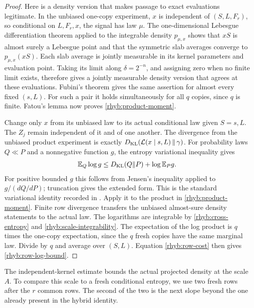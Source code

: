 \begin{proof}
Here is a density version that makes passage to exact evaluations
legitimate.  In the unbiased one-copy experiment, \(x\) is independent
of \((S,L,F_r)\), so conditional on \(L,F_r,x\), the signal has law
\(\mu\).  The one-dimensional Lebesgue differentiation theorem applied
to the integrable density \(p_{\mu,x}\) shows that \(xS\) is almost surely
a Lebesgue point and that the symmetric slab averages converge to
\(p_{\mu,x}(xS)\).  Each slab average is jointly measurable in its
kernel parameters and evaluation point.  Taking its limit along
\(\delta=2^{-n}\), and assigning zero when no finite limit exists,
therefore gives a jointly measurable density version that agrees at
these evaluations.  Fubini's theorem gives the same assertion for
almost every fixed \((s,L)\).  For such a pair it holds simultaneously
for all \(q\) copies, since \(q\) is finite.  Fatou's lemma now proves
\eqref{rhyb:product-moment}.

Change only \(x\) from its unbiased law to its actual conditional law
given \(S=s,L\).  The \(Z_j\) remain independent of it and of one
another.  The divergence from the unbiased product experiment is
exactly
\(D_{\rm KL}(\mathcal L(x\mid s,L)\,\|\,\gamma)\).
For probability laws \(Q\ll P\) and a nonnegative function \(g\), the
entropy variational inequality gives
\begin{equation}\label{rhyb:entropy-inequality}
 \mathbb E_Q\log g
 \le D_{\rm KL}(Q\|P)+\log\mathbb E_P g.
\end{equation}
For positive bounded \(g\) this follows from Jensen's inequality applied
to \(g/(dQ/dP)\); truncation gives the extended form.  This is the
standard variational identity recorded in
\cite[Equations~(1.1)--(1.2)]{DupuisMao2022}.
Apply it to the product in \eqref{rhyb:product-moment}.
Finite row divergence transfers the unbiased almost-sure density
statements to the actual law.  The logarithms are integrable by
\eqref{rhyb:cross-entropy} and \eqref{rhyb:scale-integrability}.
The expectation of the log product is \(q\) times the one-copy
expectation, since the \(q\) fresh copies have the same marginal law.
Divide by \(q\) and average over \((S,L)\).  Equation
\eqref{rhyb:row-cost} then gives \eqref{rhyb:row-log-bound}.
\end{proof}

The independent-kernel estimate bounds the actual projected density at
the scale \(A\).  To compare this scale to a fresh conditional entropy,
we use two fresh rows after the \(r\) common rows.  The second of the two
is the next slope beyond the one already present in the hybrid identity.

